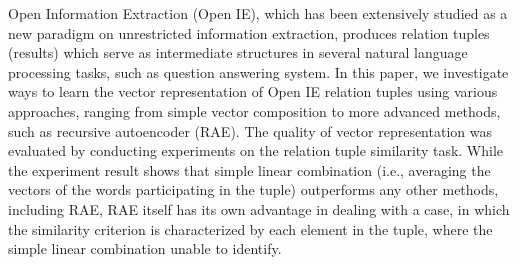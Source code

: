 Open Information Extraction (Open IE), which has been extensively studied as a new paradigm on unrestricted information extraction, produces relation tuples (results) which serve as intermediate structures in several natural language processing tasks, such as question answering system. In this paper, we investigate ways to learn the vector representation of Open IE relation tuples using various approaches, ranging from simple vector composition to more advanced methods, such as recursive autoencoder (RAE). The quality of vector representation was evaluated by conducting experiments on the relation tuple similarity task. While the experiment result shows that simple linear  combination (i.e., averaging the vectors of the words participating in the tuple) outperforms any other methods, including RAE, RAE itself has its own advantage in dealing with a case, in which the similarity criterion is characterized by each element in the tuple, where the simple linear combination unable to identify.
